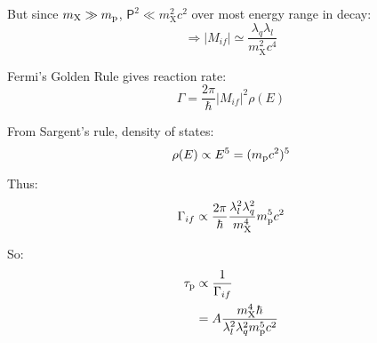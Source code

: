 \begin{parts}
	But since $m_\mathrm{X} \gg m_\mathrm{p}$, $\mathsf{P}^2 \ll m_\mathrm{X}^2 c^2$ over most energy range in decay:
	\begin{equation*}
		\Rightarrow |M_{if}| \simeq \frac{\lambda_q \lambda_l}{m_\mathrm{X}^2 c^4}
	\end{equation*}
	
	Fermi's Golden Rule gives reaction rate:
	\begin{equation*}
		\Gamma = \frac{2\pi}{\hbar} |M_{if}|^2 \rho (E)
	\end{equation*}
	
	From Sargent's rule, density of states:
	\begin{equation*}
		\rho (E) \propto E^5 = (m_\mathrm{p} c^2)^5
	\end{equation*}
	
	Thus:
	\begin{equation*}
		\Gamma_{if} \propto \frac{2\pi}{\hbar} \frac{\lambda_l^2 \lambda_q^2}{m_\mathrm{X}^4} m_\mathrm{p}^5 c^2
	\end{equation*}
	
	So:
	\begin{align*}
		\tau_\mathrm{p} &\propto \frac{1}{\Gamma_{if}} \\
		&= A \frac{m_\mathrm{X}^4 \hbar}{\lambda_l^2 \lambda_q^2 m_\mathrm{p}^5 c^2}
	\end{align*}
\end{parts}